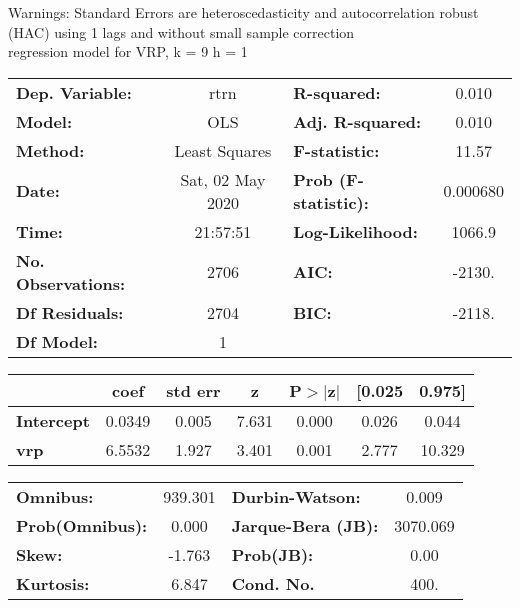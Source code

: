 Warnings: \newline
 [1] Standard Errors are heteroscedasticity and autocorrelation robust (HAC) using 1 lags and without small sample correction\\ 

regression model for VRP, k = 9 h = 1\begin{center}
\begin{tabular}{lclc}
\toprule
\textbf{Dep. Variable:}    &       rtrn       & \textbf{  R-squared:         } &     0.010   \\
\textbf{Model:}            &       OLS        & \textbf{  Adj. R-squared:    } &     0.010   \\
\textbf{Method:}           &  Least Squares   & \textbf{  F-statistic:       } &     11.57   \\
\textbf{Date:}             & Sat, 02 May 2020 & \textbf{  Prob (F-statistic):} &  0.000680   \\
\textbf{Time:}             &     21:57:51     & \textbf{  Log-Likelihood:    } &    1066.9   \\
\textbf{No. Observations:} &        2706      & \textbf{  AIC:               } &    -2130.   \\
\textbf{Df Residuals:}     &        2704      & \textbf{  BIC:               } &    -2118.   \\
\textbf{Df Model:}         &           1      & \textbf{                     } &             \\
\bottomrule
\end{tabular}
\begin{tabular}{lcccccc}
                   & \textbf{coef} & \textbf{std err} & \textbf{z} & \textbf{P$> |$z$|$} & \textbf{[0.025} & \textbf{0.975]}  \\
\midrule
\textbf{Intercept} &       0.0349  &        0.005     &     7.631  &         0.000        &        0.026    &        0.044     \\
\textbf{vrp}       &       6.5532  &        1.927     &     3.401  &         0.001        &        2.777    &       10.329     \\
\bottomrule
\end{tabular}
\begin{tabular}{lclc}
\textbf{Omnibus:}       & 939.301 & \textbf{  Durbin-Watson:     } &    0.009  \\
\textbf{Prob(Omnibus):} &   0.000 & \textbf{  Jarque-Bera (JB):  } & 3070.069  \\
\textbf{Skew:}          &  -1.763 & \textbf{  Prob(JB):          } &     0.00  \\
\textbf{Kurtosis:}      &   6.847 & \textbf{  Cond. No.          } &     400.  \\
\bottomrule
\end{tabular}
\end{center}

